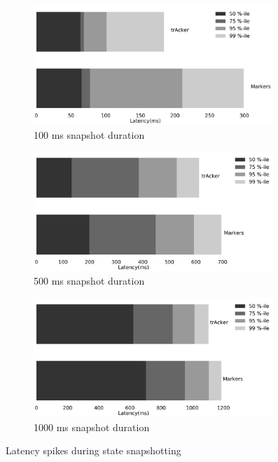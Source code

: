 \begin{figure}[t!]
    \begin{subfigure}[b]{0.32\textwidth}
            \includegraphics[width=0.99\textwidth]{pics/buffering_latencies_barh_100.png}
            \caption{100 ms snapshot duration}
            \label{100ms_snapshot}
    \end{subfigure}
    \hspace{5mm}
    \begin{subfigure}[b]{0.32\textwidth}
            \includegraphics[width=0.99\textwidth]{pics/buffering_latencies_barh_500.png}
            \caption{500 ms snapshot duration}
            \label{500ms_snapshot}
    \end{subfigure}
    \hspace{5mm}
    \begin{subfigure}[b]{0.32\textwidth}
            \includegraphics[width=0.99\textwidth]{pics/buffering_latencies_barh_1000.png}
            \caption{1000 ms snapshot duration}
            \label{1000ms_snapshot}
    \end{subfigure}
    \caption{Latency spikes during state snapshotting}
    \label{snapshot_spikes}
\end{figure}

